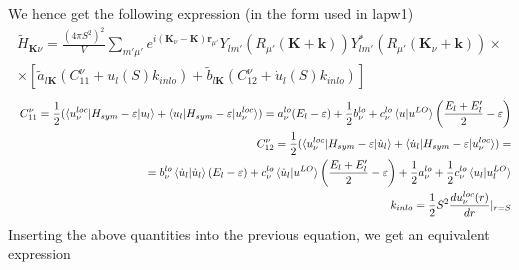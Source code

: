 \documentclass[aps,prb,floatfix,epsfig,singlecolumn,showpacs,preprintnumbers]{revtex4}
\renewcommand{\vr}{{\mathbf{r}}}
\newcommand{\vk}{{\mathbf{k}}}
\newcommand{\vK}{{\mathbf{K}}}
\begin{document}
We hence get the following expression (in the form used in lapw1)
\begin{eqnarray}
\widetilde{H}_{\vK\nu}=\frac{(4\pi  S^2)^2}{V}\sum_{m'\mu'} e^{i(\vK_\nu-\vK)\vr_{\mu'}}
Y_{lm'}(R_{\mu'}(\vK+\vk)) Y^*_{lm'}(R_{\mu'}(\vK_\nu+\vk))  \times\\
\times\left[
\tilde{a}_{l\vK} (C^\nu_{11} +u_l(S) k_{inlo} ) + \tilde{b}_{l\vK} (C^\nu_{12}+\dot{u}_l(S) k_{inlo})
\right]
\end{eqnarray}
\begin{eqnarray}
&& C^\nu_{11} = \frac{1}{2}(\braket{u^{loc}_\nu|H_{sym}-\varepsilon|u_l}+\braket{u_l|H_{sym}-\varepsilon|u^{loc}_\nu})
   = a^{lo}_\nu (E_l-\varepsilon) + \frac{1}{2} b^{lo}_\nu + c^{lo}_\nu \braket{u|u^{LO}}\left(\frac{E_l+E'_l}{2}-\varepsilon\right)\\
&& C^\nu_{12} =  \frac{1}{2}(\braket{u^{loc}_\nu|H_{sym}-\varepsilon|\dot{u}_l}+\braket{\dot{u}_l|H_{sym}-\varepsilon|u^{loc}_\nu}) 
= \nonumber\\
&&\qquad\qquad\qquad =b^{lo}_\nu \braket{\dot{u}_l|\dot{u}_l}(E_l-\varepsilon) + 
c^{lo}_\nu\braket{\dot{u}_l|u^{LO}}\left(\frac{E_l+E'_l}{2}-\varepsilon\right) +
\frac{1}{2} a^{lo}_\nu+
\frac{1}{2}c^{lo}_\nu\braket{u_l|u_l^{LO}}
\\
&& k_{inlo} = \frac{1}{2}  S^2  \frac{du_\nu^{loc}(r)}{dr}|_{r=S}
\end{eqnarray}
Inserting the above quantities into the previous equation, we get an
equivalent expression
\end{document}
